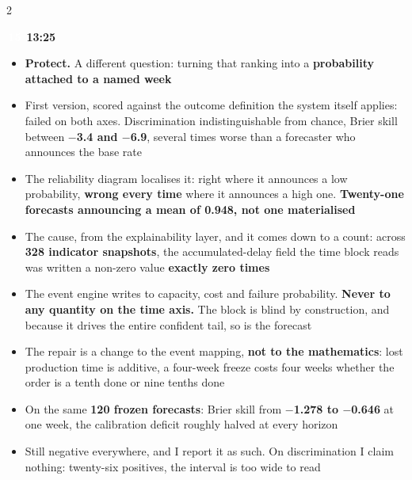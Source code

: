 \documentclass[a4paper,8pt]{extarticle}
\newcommand{\slidehead}[3]{%
  \par\vspace{2.8pt}\noindent
  \colorbox{altenNavy}{\textcolor{white}{\bfseries\,\footnotesize #1\,}}%
  \hspace{4pt}{\bfseries\color{altenNavy}#2}%
  \hfill{\bfseries\scriptsize\color{altenAzure}#3}\par\vspace{0.5pt}}
\newcommand{\scene}[1]{{\bfseries\color{altenAzureDark}#1}}
\newcommand{\num}[1]{\textbf{#1}}
\begin{document}
\begin{multicols}{2}
\slidehead{15}{Result two, one block explained it}{13:25}
\begin{itemize}
  \item \scene{Protect.} A different question: turning that ranking into a \textbf{probability attached to a named week}
  \item First version, scored against the outcome definition the system itself applies: failed on both axes. Discrimination indistinguishable from chance, Brier skill between \num{$-$3.4 and $-$6.9}, several times worse than a forecaster who announces the base rate
  \item The reliability diagram localises it: right where it announces a low probability, \textbf{wrong every time} where it announces a high one. \num{Twenty-one forecasts announcing a mean of 0.948, not one materialised}
  \item The cause, from the explainability layer, and it comes down to a count: across \num{328 indicator snapshots}, the accumulated-delay field the time block reads was written a non-zero value \num{exactly zero times}
  \item The event engine writes to capacity, cost and failure probability. \textbf{Never to any quantity on the time axis.} The block is blind by construction, and because it drives the entire confident tail, so is the forecast
  \item The repair is a change to the event mapping, \textbf{not to the mathematics}: lost production time is additive, a four-week freeze costs four weeks whether the order is a tenth done or nine tenths done
  \item On the same \num{120 frozen forecasts}: Brier skill from \num{$-$1.278 to $-$0.646} at one week, the calibration deficit roughly halved at every horizon
  \item Still negative everywhere, and I report it as such. On discrimination I claim nothing: twenty-six positives, the interval is too wide to read
\end{itemize}


\end{multicols}
\end{document}
